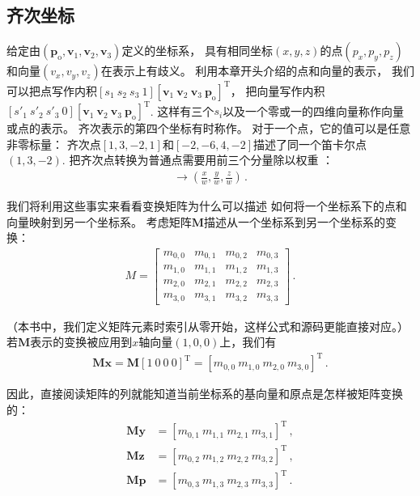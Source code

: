 \subsection{齐次坐标}\label{sub:齐次坐标}
给定由$(\bm p_\mathrm{o},\bm v_1,\bm v_2,\bm v_3)$定义的坐标系，
具有相同坐标$(x,y,z)$的点$(p_x,p_y,p_z)$和向量$(v_x,v_y,v_z)$在表示上有歧义。
利用本章开头介绍的点和向量的表示，
我们可以把点写作内积$[s_1\ s_2\ s_3\ 1][\bm v_1\ \bm v_2\ \bm v_3\ \bm p_\mathrm{o}]^\mathrm{T}$，
把向量写作内积$[s'_1\ s'_2\ s'_3\ 0][\bm v_1\ \bm v_2\ \bm v_3\ \bm p_\mathrm{o}]^\mathrm{T}$.
这样有三个$s_i$以及一个零或一的四维向量称作向量或点的表示。
齐次表示的第四个坐标有时称作。
对于一个点，它的值可以是任意非零标量：
齐次点$[1,3,-2,1]$和$[-2,-6,4,-2]$描述了同一个笛卡尔点$(1,3,-2)$.
把齐次点转换为普通点需要用前三个分量除以权重
：
\begin{align*}
    [x,y,z,w]\rightarrow\left(\frac{x}{w},\frac{y}{w},\frac{z}{w}\right)\, .
\end{align*}

我们将利用这些事实来看看变换矩阵为什么可以描述
如何将一个坐标系下的点和向量映射到另一个坐标系。
考虑矩阵$\bm M$描述从一个坐标系到另一个坐标系的变换：
\begin{align*}
    M=\left[
        \begin{array}{cccc}
            m_{0,0} & m_{0,1} & m_{0,2} & m_{0,3} \\
            m_{1,0} & m_{1,1} & m_{1,2} & m_{1,3} \\
            m_{2,0} & m_{2,1} & m_{2,2} & m_{2,3} \\
            m_{3,0} & m_{3,1} & m_{3,2} & m_{3,3}
        \end{array}
        \right]\, .
\end{align*}

（本书中，我们定义矩阵元素时索引从零开始，这样公式和源码更能直接对应。）
若$\bm M$表示的变换被应用到$x$轴向量$(1,0,0)$上，我们有
\begin{align*}
    \bm M\bm x=\bm M[1\ 0\ 0\ 0]^\mathrm{T}=[m_{0,0}\ m_{1,0}\ m_{2,0}\ m_{3,0}]^\mathrm{T}\, .
\end{align*}

因此，直接阅读矩阵的列就能知道当前坐标系的基向量和原点是怎样被矩阵变换的：
\begin{align*}
    \bm M\bm y & =[m_{0,1}\ m_{1,1}\ m_{2,1}\ m_{3,1}]^\mathrm{T}\, , \\
    \bm M\bm z & =[m_{0,2}\ m_{1,2}\ m_{2,2}\ m_{3,2}]^\mathrm{T}\, , \\
    \bm M\bm p & =[m_{0,3}\ m_{1,3}\ m_{2,3}\ m_{3,3}]^\mathrm{T}\, .
\end{align*}

